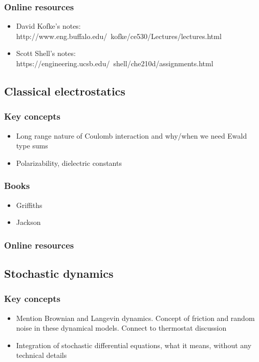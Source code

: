 \documentclass[9pt,bestpractices]{livecoms}
\begin{document}
\subsubsection{Online resources}
\begin{itemize}
\item David Kofke’s notes: http://www.eng.buffalo.edu/~kofke/ce530/Lectures/lectures.html
\item Scott Shell’s notes: https://engineering.ucsb.edu/~shell/che210d/assignments.html
\end{itemize}

\subsection{Classical electrostatics}
\label{ref:classical_electrostatics}
\subsubsection{Key concepts}
\begin{itemize}
\item Long range nature of Coulomb interaction and why/when we need Ewald type sums
\item Polarizability, dielectric constants
\end{itemize}
\subsubsection{Books}
\begin{itemize}
\item Griffiths
\item Jackson
\end{itemize}
\subsubsection{Online resources}

\subsection{Stochastic dynamics}
\subsubsection{Key concepts}
\begin{itemize}
\item Mention Brownian and Langevin dynamics. Concept of friction and random noise in these dynamical models. Connect to thermostat discussion
\item Integration of stochastic differential equations, what it means, without any technical details
\end{itemize}
\end{document}

